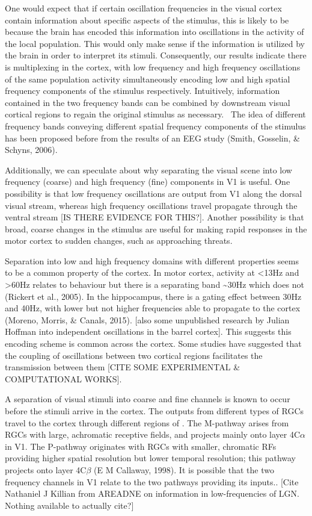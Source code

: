 One would expect that if certain oscillation frequencies in the visual cortex contain information about specific aspects of the stimulus, this is likely to be because the brain has encoded this information into oscillations in the activity of the local population.
This would only make sense if the information is utilized by the brain in order to interpret its stimuli.
Consequently, our results indicate there is multiplexing in the cortex, with low frequency and high frequency oscillations of the same population activity simultaneously encoding low and high spatial frequency components of the stimulus respectively.
Intuitively, information contained in the two frequency bands can be combined by downstream visual cortical regions to regain the original stimulus as necessary.
\ The idea of different frequency bands conveying different spatial frequency components of the stimulus has been proposed before from the results of an \ac{EEG} study (Smith, Gosselin, \& Schyns, 2006).

Additionally, we can speculate about why separating the visual scene into low frequency (coarse) and high frequency (fine) components in \ac{V1} is useful.
One possibility is that low frequency oscillations are output from \ac{V1} along the dorsal visual stream, whereas high frequency oscillations travel propagate through the ventral stream [IS THERE EVIDENCE FOR THIS?].
Another possibility is that broad, coarse changes in the stimulus are useful for making rapid responses in the motor cortex to sudden changes, such as approaching threats.

Separation into low and high frequency domains with different properties seems to be a common property of the cortex.
In motor cortex, activity at {\textless}13Hz and {\textgreater}60Hz relates to behaviour but there is a separating band \~{}30Hz which does not (Rickert et al., 2005).
In the hippocampus, there is a gating effect between 30Hz and 40Hz, with lower but not higher frequencies able to propagate to the cortex (Moreno, Morris, \& Canals, 2015).
[also some unpublished research by Julian Hoffman into independent oscillations in the barrel cortex].
This suggests this encoding scheme is common across the cortex.
Some studies have suggested that the coupling of oscillations between two cortical regions facilitates the transmission between them [CITE SOME EXPERIMENTAL \& COMPUTATIONAL WORKS].

A separation of visual stimuli into coarse and fine channels is known to occur before the stimuli arrive in the cortex.
The outputs from different types of \acp{RGC} travel to the cortex through different regions of .
The M-pathway arises from \acp{RGC} with large, achromatic receptive fields, and projects mainly onto layer 4C$\alpha$ in \ac{V1}.
The P-pathway originates with \acp{RGC} with smaller, chromatic \acp{RF} providing higher spatial resolution but lower temporal resolution; this pathway projects onto layer 4C$\beta$ (E M Callaway, 1998).
It is possible that the two frequency channels in \ac{V1} relate to the two pathways providing its inputs..
[Cite Nathaniel J Killian from AREADNE on information in low-frequencies of \ac{LGN}.
Nothing available to actually cite?]

